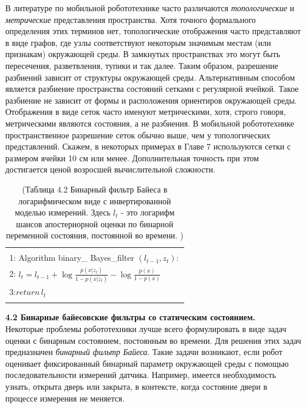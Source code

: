 \documentclass[10pt,a4paper]{article}
\begin{document}
В литературе по мобильной робототехнике часто различаются \textit{топологические} и \textit{метрические}
представления пространства. Хотя точного формального определения этих терминов нет, топологические отображения часто представляют в виде графов, где узлы соответствуют некоторым значимым местам (или признакам) окружающей среды. В замкнутых пространствах это могут быть пересечения, разветвления, тупики и так далее. Таким образом, разрешение разбиений зависит от структуры окружающей среды. Альтернативным способом является разбиение пространства состояний сетками с регулярной ячейкой. Такое разбиение не зависит от формы и расположения ориентиров окружающей среды. Отображения в виде сеток часто именуют метрическими, хотя, строго говоря, метрическими являются состояния, а не разбиения. В мобильной робототехнике пространственное разрешение сеток обычно выше, чем у топологических представлений. Скажем, в некоторых примерах в Главе 7 используются сетки с размером ячейки 10 см или менее. Дополнительная точность при этом достигается ценой возросшей вычислительной сложности.\\ 

\begin{table}[H]
\begin{center}
\begin{tabular}{|l|}
\hline
{}\\
1: \hspace{3mm} Algorithm binary\_ Bayes\_filter $(l_{t-1},z_t):$ \\
2: \hspace{7mm}$l_t=l_{t-1}+\log\frac{p(x|z_t)}{1-p(x|z_t)}-\log\frac{p(x)}{1-p(x)}$\\
3:\hspace{7mm}$\textit{return} \,l_t$\\
{}\\
\hline
\end{tabular}
\caption{(Таблица 4.2 Бинарный фильтр Байеса в логарифмическом виде с инвертированной моделью измерений. Здесь $l_t$ - это логарифм шансов апостериорной оценки по бинарной переменной состояния, постоянной во времени. )}
	\end{center}
\end{table}

\textbf{4.2 Бинарные байесовские фильтры со статическим состоянием.}\\

Некоторые проблемы робототехники лучше всего формулировать в виде задач оценки с бинарным состоянием, постоянным во времени. Для решения этих задач предназначен \textit{бинарный фильтр Байеса}. Такие задачи возникают, если робот оценивает фиксированный бинарный параметр окружающей среды с помощью последовательности измерений датчика. Например, имеется необходимость узнать, открыта дверь или закрыта, в контексте, когда состояние двери в процессе измерения не меняется. 
\end{document}
